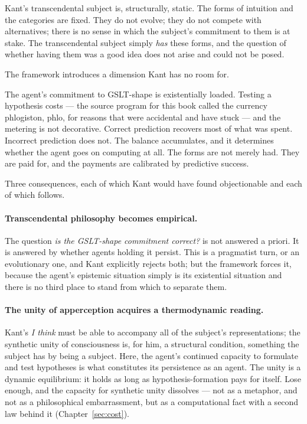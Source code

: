 Kant's transcendental subject is, structurally, static.
The forms of intuition and the categories are fixed.
They do not evolve; they do not compete with alternatives; there is
no sense in which the subject's commitment to them is at stake.
The transcendental subject simply \emph{has} these forms, and the
question of whether having them was a good idea does not arise and
could not be posed.

The framework introduces a dimension Kant has no room for.

The agent's commitment to GSLT-shape is existentially loaded.
Testing a hypothesis costs --- the source program for this book
called the currency phlogiston, phlo, for reasons that were
accidental and have stuck --- and the metering is not decorative.
Correct prediction recovers most of what was spent.
Incorrect prediction does not.
The balance accumulates, and it determines whether the agent goes
on computing at all.
The forms are not merely had.
They are paid for, and the payments are calibrated by predictive
success.

Three consequences, each of which Kant would have found
objectionable and each of which follows.

\paragraph{Transcendental philosophy becomes empirical.}
The question \emph{is the GSLT-shape commitment correct?} is not
answered a priori.
It is answered by whether agents holding it persist.
This is a pragmatist turn, or an evolutionary one, and Kant
explicitly rejects both; but the framework forces it, because the
agent's epistemic situation simply is its existential situation and
there is no third place to stand from which to separate them.

\paragraph{The unity of apperception acquires a thermodynamic reading.}
Kant's \emph{I think} must be able to accompany all of the
subject's representations; the synthetic unity of consciousness is,
for him, a structural condition, something the subject has by being
a subject.
Here, the agent's continued capacity to formulate and test
hypotheses is what constitutes its persistence as an agent.
The unity is a dynamic equilibrium: it holds as long as
hypothesis-formation pays for itself.
Lose enough, and the capacity for synthetic unity dissolves --- not
as a metaphor, and not as a philosophical embarrassment, but as a
computational fact with a second law behind it
(Chapter~\ref{sec:cost}).

